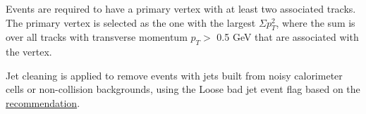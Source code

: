 Events are required to have a primary vertex with at least two associated tracks. The primary vertex is selected as the one with the largest $\Sigma p_T^2$, where the sum is over all tracks with transverse momentum $p_T >$ 0.5 GeV that are associated with the vertex.
 
Jet cleaning is applied to remove events with jets built from noisy calorimeter cells or non-collision backgrounds,
using the Loose bad jet event flag based on the \mbox{\href{https://twiki.cern.ch/twiki/bin/view/AtlasProtected/HowToCleanJets2017}{recommendation}}.

